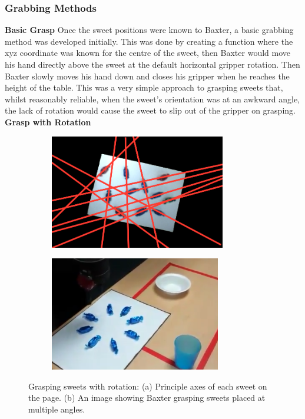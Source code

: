 \subsubsection{Grabbing Methods}
\textbf{Basic Grasp}\newline
Once the sweet positions were known to Baxter, a basic grabbing method was developed initially. This was done by creating a function where the xyz coordinate was known for the centre of the sweet, then Baxter would move his hand directly above the sweet at the default horizontal gripper rotation. Then Baxter slowly moves his hand down and closes his gripper when he reaches the height of the table. This was a very simple approach to grasping sweets that, whilst reasonably reliable, when the sweet's orientation was at an awkward angle, the lack of rotation would cause the sweet to slip out of the gripper on grasping.\newline\newline
\textbf{Grasp with Rotation}
\begin{figure}[H]
    \captionsetup[subfigure]{justification=centering}
    \begin{subfigure}[H]{0.475\textwidth}   
        \centering 
        \caption{}
        \label{fig:PCA}
        \includegraphics[width=\textwidth, height=5cm]{pcaexample.png}
    \end{subfigure}
    \begin{subfigure}[H]{0.475\textwidth}   
        \centering 
        \caption{}
        \label{fig:RotationGrasp}
        \includegraphics[width=\textwidth, height=5cm]{graspwithrotation.png}
    \end{subfigure}
    \caption{Grasping sweets with rotation: (a) Principle axes of each sweet on the page. (b) An image showing Baxter grasping sweets placed at multiple angles.}
\end{figure}
